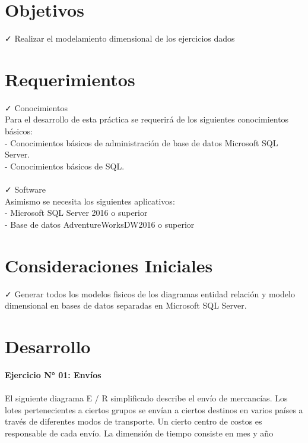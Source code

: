 

\section{Objetivos}
✓ Realizar el modelamiento dimensional de los ejercicios dados

\section{Requerimientos}
\item{✓ Conocimientos\\
Para el desarrollo de esta práctica se requerirá de los siguientes conocimientos básicos:\\
- Conocimientos básicos de administración de base de datos Microsoft SQL Server.\\
- Conocimientos básicos de SQL.\\\\
✓ Software\\
Asimismo se necesita los siguientes aplicativos:\\
- Microsoft SQL Server 2016 o superior\\
- Base de datos AdventureWorksDW2016 o superior}

\section{Consideraciones Iniciales}
\item{
✓ Generar todos los modelos fisicos de los diagramas entidad relación y modelo dimensional en bases de datos separadas en Microsoft SQL Server.}

\newpage

\section{Desarrollo}
\item{
\textbf{Ejercicio N° 01: Envíos}\\\\
El siguiente diagrama E / R simplificado describe el envío de mercancías. Los lotes pertenecientes a ciertos grupos se
envían a ciertos destinos en varios países a través de diferentes modos de transporte. Un cierto centro de costos es
responsable de cada envío. La dimensión de tiempo consiste en mes y año}

